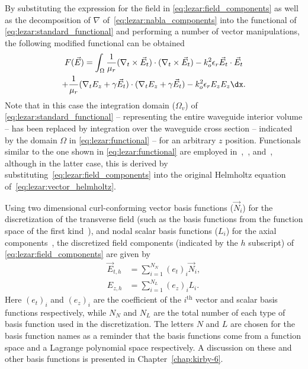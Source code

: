 By substituting the expression for the field
in \eqref{eq:lezar:field_components} as well as the decomposition of
$\nabla$ of~\eqref{eq:lezar:nabla_components} into the functional
of \eqref{eq:lezar:standard_functional} and performing a number of
vector manipulations, the following modified functional can be
obtained
\begin{multline}
    \label{eq:lezar:functional}
    F(\vec{E}) = \int_{\Omega}\frac{1}{\mu_r}(\nabla_t\times{\vec{E}_t})\cdot(\nabla_t\times{\vec{E}_t}) -k_o^2\epsilon_r\vec{E}_t\cdot{\vec{E}_t}\\
    +\frac{1}{\mu_r}(\nabla_t{E_z} + \gamma\vec{E}_t)\cdot(\nabla_t{E_z} + \gamma\vec{E}_t)
    -k_o^2\epsilon_r E_z{E_z} \dx.
\end{multline}
Note that in this case the integration domain ($\Omega_v$)
of \eqref{eq:lezar:standard_functional} -- representing the entire
waveguide interior volume -- has been replaced by integration over the
waveguide cross section -- indicated by the domain $\Omega$
in \eqref{eq:lezar:functional} -- for an arbitrary $z$
position. Functionals similar to the one shown
in \eqref{eq:lezar:functional} are employed
in~\citet{LeeSunCendes1991},~\citet{Jin2002},
and~\citet{PelosiCoccioliSelleri1998}, although in the latter case,
this is derived by substituting~\eqref{eq:lezar:field_components} into
the original Helmholtz equation of~\eqref{eq:lezar:vector_helmholtz}.

Using two dimensional curl-conforming vector basis functions
($\vec{N}_i$) for the discretization of the transverse field (such as
the basis functions from the \nedelec{} function space of the first
kind~\citep{Nedelec1980, Webb1993, Monk2003}), and nodal scalar basis
functions ($L_i$) for the axial components~\citep{Jin2002,
PelosiCoccioliSelleri1998}, the discretized field components
(indicated by the $h$ subscript) of \eqref{eq:lezar:field_components}
are given by~\citep{Jin2002, PelosiCoccioliSelleri1998}
\begin{align}
  \label{eq:lezar:E_t_discretized}
  \vec{E}_{t,h} &= \sum_{i=1}^{N_N} (e_t)_i \vec{N}_i,\\
  \label{eq:lezar:E_z_discretized}
  E_{z,h} &= \sum_{i=1}^{N_L} (e_z)_i L_i.
\end{align}
Here $(e_t)_i$ and $(e_z)_i$ are the coefficient of the $i^\text{th}$
vector and scalar basis functions respectively, while $N_N$ and $N_L$
are the total number of each type of basis function used in the
discretization. The letters $N$ and $L$ are chosen for the basis
function names as a reminder that the basis functions come from
a \nedelec{} function space and a Lagrange polynomial space
respectively. A discussion on these and other basis functions is
presented in Chapter~\ref{chap:kirby-6}.

